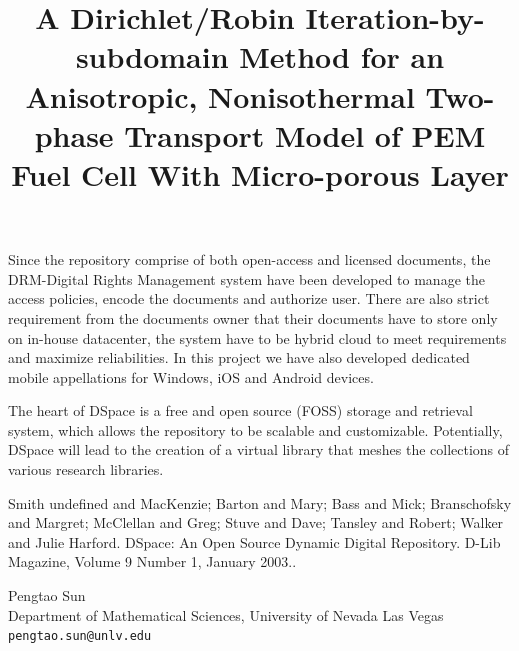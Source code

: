 \documentclass[article, A4, 11pt]{llncs}%
\begin{document}
Since the repository comprise of both open-access and licensed documents, the DRM-Digital Rights Management system have been developed to manage the access policies, encode the documents and authorize user. There are also strict requirement from the documents owner that their documents have to store only on in-house datacenter, the system have to be hybrid cloud to meet requirements and maximize reliabilities. In this project we have also developed dedicated mobile appellations for Windows, iOS and Android devices. 

The heart of DSpace is a free and open source (FOSS) storage and retrieval system, which allows the repository to be scalable and customizable. Potentially, DSpace will lead to the creation of a virtual library that meshes the collections of various research libraries. 




\begin{thebibliography}{10}
{\sc Smith undefined and MacKenzie; Barton and Mary; Bass and Mick; Branschofsky and Margret; McClellan and Greg; Stuve and Dave; Tansley and Robert; Walker and Julie Harford}. {DSpace: An Open Source Dynamic Digital Repository}. D-Lib Magazine, Volume 9 Number 1, January 2003..
\end{thebibliography} %

\title{A Dirichlet/Robin Iteration-by-subdomain Method for an Anisotropic, Nonisothermal Two-phase Transport Model of PEM Fuel Cell With Micro-porous Layer}
 \author{} \institute{}
\maketitle
\begin{center}
{\large Pengtao Sun}\\
Department of Mathematical Sciences, University of Nevada Las Vegas\\
{\tt pengtao.sun@unlv.edu}
\end{center}
\end{document}
